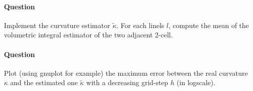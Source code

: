 \documentclass[a4paper, 11pt]{article}
\begin{document}
\paragraph{Question} Implement the curvature estimator $\tilde{\kappa}$. For each linels $l$, compute the mean of the volumetric integral estimator of the two adjacent 2-cell.

\paragraph{Question} Plot (using gnuplot for example) the maximum error between the real curvature $\kappa$ and the estimated one $\tilde{\kappa}$ with a decreasing grid-step $h$ (in logscale).
\end{document}
